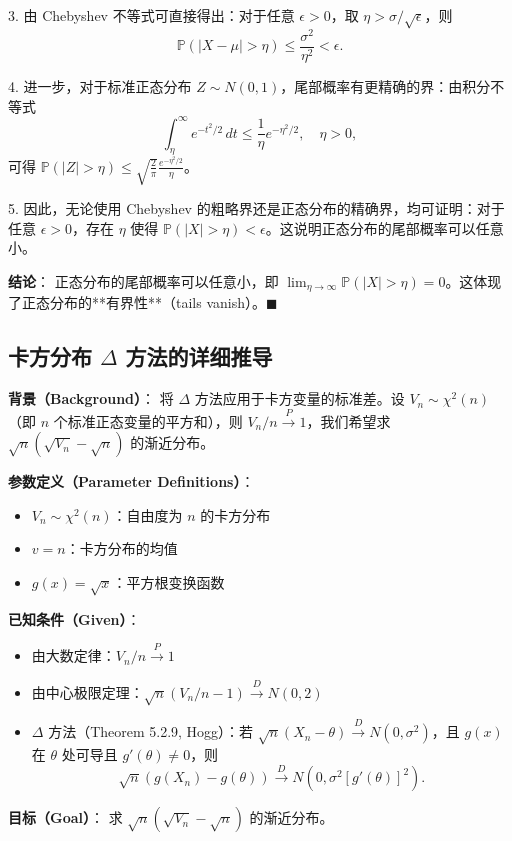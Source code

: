 3. 由 Chebyshev 不等式可直接得出：对于任意 $\epsilon > 0$，取 $\eta > \sigma / \sqrt{\epsilon}$，则
\[
\mathbb{P}(|X - \mu| > \eta) \leq \frac{\sigma^2}{\eta^2} < \epsilon.
\]

4. 进一步，对于标准正态分布 $Z \sim N(0,1)$，尾部概率有更精确的界：由积分不等式
\[
\int_\eta^\infty e^{-t^2/2} \, dt \leq \frac{1}{\eta} e^{-\eta^2/2}, \quad \eta > 0,
\]
可得 $\mathbb{P}(|Z| > \eta) \leq \sqrt{\frac{2}{\pi}} \frac{e^{-\eta^2/2}}{\eta}$。

5. 因此，无论使用 Chebyshev 的粗略界还是正态分布的精确界，均可证明：对于任意 $\epsilon > 0$，存在 $\eta$ 使得 $\mathbb{P}(|X| > \eta) < \epsilon$。这说明正态分布的尾部概率可以任意小。

\textbf{结论}：
正态分布的尾部概率可以任意小，即 $\lim_{\eta \to \infty} \mathbb{P}(|X| > \eta) = 0$。这体现了正态分布的**有界性**（tails vanish）。$\blacksquare$

\subsection{卡方分布 $\Delta$ 方法的详细推导}\label{sec:chi-square-delta-method}

\textbf{背景（Background）}：
将 $\Delta$ 方法应用于卡方变量的标准差。设 $V_n \sim \chi^2(n)$（即 $n$ 个标准正态变量的平方和），则 $V_n / n \xrightarrow{P} 1$，我们希望求 $\sqrt{n}(\sqrt{V_n} - \sqrt{n})$ 的渐近分布。

\textbf{参数定义（Parameter Definitions）}：
\begin{itemize}
\item $V_n \sim \chi^2(n)$：自由度为 $n$ 的卡方分布
\item $v = n$：卡方分布的均值
\item $g(x) = \sqrt{x}$：平方根变换函数
\end{itemize}

\textbf{已知条件（Given）}：
\begin{itemize}
\item 由大数定律：$V_n / n \xrightarrow{P} 1$
\item 由中心极限定理：$\sqrt{n}(V_n/n - 1) \xrightarrow{D} N(0, 2)$
\item $\Delta$ 方法（Theorem 5.2.9, Hogg）：若 $\sqrt{n}(X_n - \theta) \xrightarrow{D} N(0, \sigma^2)$，且 $g(x)$ 在 $\theta$ 处可导且 $g'(\theta) \neq 0$，则
\[
\sqrt{n}(g(X_n) - g(\theta)) \xrightarrow{D} N\left(0, \sigma^2 [g'(\theta)]^2\right).
\]
\end{itemize}

\textbf{目标（Goal）}：
求 $\sqrt{n}(\sqrt{V_n} - \sqrt{n})$ 的渐近分布。

